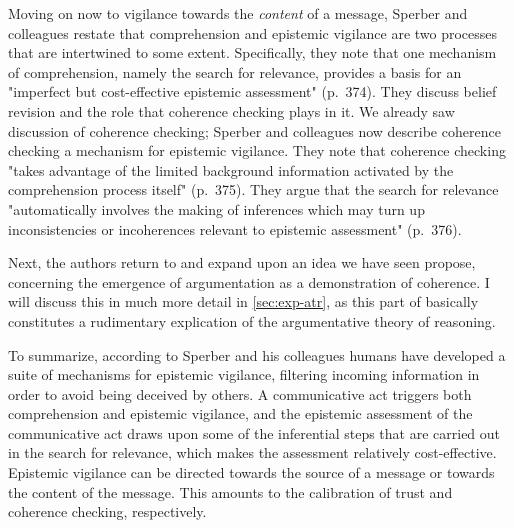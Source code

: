 
Moving on now to vigilance towards the \emph{content} of a message, Sperber and colleagues restate that comprehension and epistemic vigilance are two processes that are intertwined to some extent. Specifically, they note that one mechanism of comprehension, namely the search for relevance, provides a basis for an "imperfect but cost-effective epistemic assessment" (p.~374).
They discuss belief revision and the role that coherence checking plays in it. We already saw  discussion of coherence checking; Sperber and colleagues now describe coherence checking a mechanism for epistemic vigilance. They note that coherence checking "takes advantage of the limited background information activated by the comprehension process itself" (p.~375). They argue that the search for relevance "automatically involves the making of inferences which may turn up inconsistencies or incoherences relevant to epistemic assessment" (p.~376).

Next, the authors return to and expand upon an idea we have seen \citet{Sperber01} propose, concerning the emergence of argumentation as a demonstration of coherence. I will discuss this in much more detail in \cref{sec:exp-atr}, as this part of \citet{Sperber10} basically constitutes a rudimentary explication of the argumentative theory of reasoning.

To summarize, according to Sperber and his colleagues humans have developed a suite of mechanisms for epistemic vigilance, filtering incoming information in order to avoid being deceived by others. A communicative act triggers both comprehension and epistemic vigilance, and the epistemic assessment of the communicative act draws upon some of the inferential steps that are carried out in the search for relevance, which makes the assessment relatively cost-effective. Epistemic vigilance can be directed towards the source of a message or towards the content of the message. This amounts to the calibration of trust and coherence checking, respectively.
